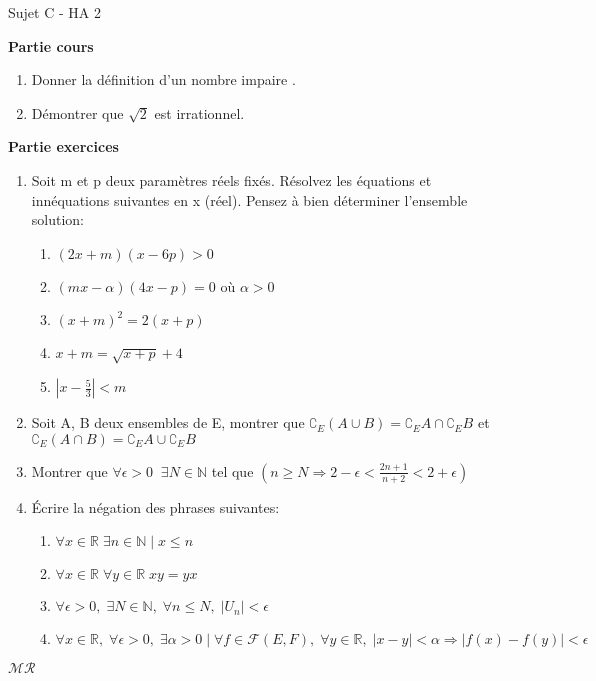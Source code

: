 \documentclass[a4paper,11pt, landscape]{article}
\begin{document}
\begin{multicols*}{3}
\vfill\null
\columnbreak
\centerline{Sujet C - HA 2}
\begin{flushleft}
  \textbf{Partie cours} 
\end{flushleft} 
\begin{enumerate}
  \item Donner la définition d'un nombre impaire .
  \item Démontrer que $\sqrt{2}$ est irrationnel.
\end{enumerate}
\textbf{Partie exercices}
\begin{enumerate}
  \item Soit m et p deux paramètres réels fixés. Résolvez les équations et innéquations suivantes en x (réel). Pensez à bien déterminer l'ensemble solution:
  \begin{enumerate}
    \item $(2x+m)(x-6p) > 0$
    \item $(mx-\alpha)(4x-p) = 0$ où $\alpha > 0$
    \item $(x+m)^2 = 2(x+p)$
    \item $x+m = \sqrt{x+p} + 4$
    \item $|x-\frac{5}{3}| < m$
  \end{enumerate}
  \item Soit A, B deux ensembles de E, montrer que $\complement_E{(A \cup B)} = \complement_E{A} \cap \complement_E{B}$ et $\complement_E{(A \cap B)} = \complement_E{A} \cup \complement_E{B}$
  \item Montrer que $\forall \epsilon > 0 \;\; \exists N \in \mathbb{N}$ tel que $(n \geq N \Rightarrow 2 - \epsilon < \frac{2n+1}{n+2} < 2+\epsilon)$
  \item Écrire la négation des phrases suivantes:
  \begin{enumerate}
    \item $\forall x \in \mathbb{R} \; \exists n \in  \mathbb{N} \; | \; x \leq n$
    \item $\forall x \in \mathbb{R} \; \forall y \in \mathbb{R} \; xy = yx$
    \item $\forall \epsilon > 0, \; \exists N \in \mathbb{N}, \; \forall n \leq N, \; |U_n| < \epsilon$
    \item $\forall x \in \mathbb{R}, \; \forall \epsilon > 0, \; \exists \alpha > 0 \; | \; \forall f \in \mathcal{F}(E,F), \; \forall y \in \mathbb{R}, \; |x-y|< \alpha \Rightarrow |f(x) - f(y)| < \epsilon$
  \end{enumerate}
\end{enumerate}
\centerline{$\mathcal{MR}$}


\end{multicols*}
\end{document}
